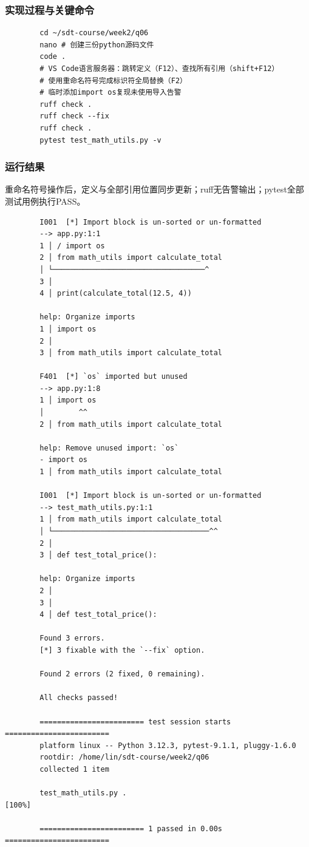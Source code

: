 \documentclass[a4paper,12pt]{ctexart}
\begin{document}
	\subsubsection{实现过程与关键命令}
	\begin{lstlisting}
		cd ~/sdt-course/week2/q06
		nano # 创建三份python源码文件
		code .
		# VS Code语言服务器：跳转定义（F12）、查找所有引用（shift+F12）
		# 使用重命名符号完成标识符全局替换（F2）
		# 临时添加import os复现未使用导入告警
		ruff check .
		ruff check --fix
		ruff check .
		pytest test_math_utils.py -v
	\end{lstlisting}
	
	\subsubsection{运行结果}
	重命名符号操作后，定义与全部引用位置同步更新；ruff无告警输出；pytest全部测试用例执行PASS。
	\begin{lstlisting}
		I001  [*] Import block is un‑sorted or un‑formatted
		--> app.py:1:1
		1 │ / import os
		2 │ from math_utils import calculate_total
		│ └───────────────────────────────────^
		3 │
		4 │ print(calculate_total(12.5, 4))
		
		help: Organize imports
		1 │ import os
		2 │
		3 │ from math_utils import calculate_total
		
		F401  [*] `os` imported but unused
		--> app.py:1:8
		1 │ import os
		│        ^^
		2 │ from math_utils import calculate_total
		
		help: Remove unused import: `os`
		- import os
		1 │ from math_utils import calculate_total
		
		I001  [*] Import block is un‑sorted or un‑formatted
		--> test_math_utils.py:1:1
		1 │ from math_utils import calculate_total
		│ └────────────────────────────────────^^
		2 │
		3 │ def test_total_price():
		
		help: Organize imports
		2 │
		3 │
		4 │ def test_total_price():
		
		Found 3 errors.
		[*] 3 fixable with the `--fix` option.
		
		Found 2 errors (2 fixed, 0 remaining).
		
		All checks passed!
		
		======================== test session starts ========================
		platform linux -- Python 3.12.3, pytest‑9.1.1, pluggy‑1.6.0
		rootdir: /home/lin/sdt‑course/week2/q06
		collected 1 item
		
		test_math_utils.py .                                                               [100%]
		
		======================== 1 passed in 0.00s ========================
	\end{lstlisting}
	
\end{document}
